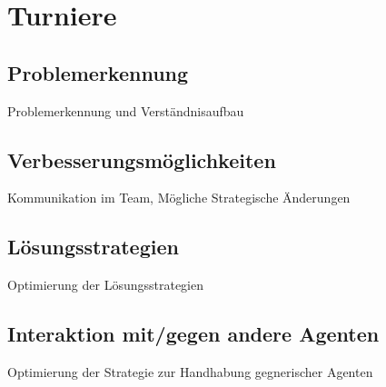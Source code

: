 \chapter{Turniere}

\section{Problemerkennung}
Problemerkennung und Verständnisaufbau

\section{Verbesserungsmöglichkeiten}
Kommunikation im Team, Mögliche Strategische Änderungen

\section{Lösungsstrategien}
Optimierung der Lösungsstrategien

\section{Interaktion mit/gegen andere Agenten}
Optimierung der Strategie zur Handhabung gegnerischer Agenten
